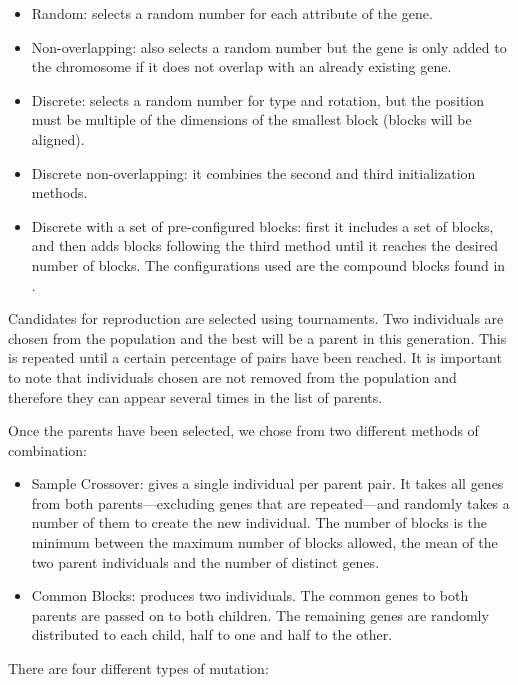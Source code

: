 \documentclass[a4paper,twoside]{article}
\begin{document}
\begin{itemize}
	\item Random: selects a random number for each attribute of the gene.
	\item Non-overlapping: also selects a random number but the gene is only 
	added to the chromosome if it does not overlap with an already existing 
	gene.
	\item Discrete: selects a random number for type and rotation, but the 
	position must be multiple of the dimensions of the smallest block (blocks 
	will be aligned).
	\item Discrete non-overlapping: it combines the second and third 
	initialization methods.
	\item Discrete with a set of pre-configured blocks: first it includes
	a set of blocks, and then adds blocks following the third method until
	it reaches the desired number of blocks. The configurations used are the
	compound blocks found in \cite{ferreira2014search}.
\end{itemize}

Candidates for reproduction are selected using tournaments. Two individuals are chosen from the 
population and the best will be a parent in this generation. This is 
repeated until a certain percentage of pairs have been reached. It is important 
to note that individuals chosen are not removed from the population and 
therefore they can appear several times in the list of parents. 

Once the parents have been selected, we chose from two different methods of 
combination:
\begin{itemize}
	\item Sample Crossover: gives a single individual per parent pair. It takes 
	all genes from both parents---excluding genes that are repeated---and 
	randomly takes a number of them to create the new individual. The number of 
	blocks is the minimum between the maximum number of blocks allowed, the 
	mean of the two parent individuals and the number of distinct genes.
	\item Common Blocks: produces two individuals. The common genes to both 
	parents are passed on to both children. The remaining genes are randomly 
	distributed to each child, half to one and half to the other. 
	\label{ga:cross2}
\end{itemize}

There are four different types of mutation:
\end{document}
